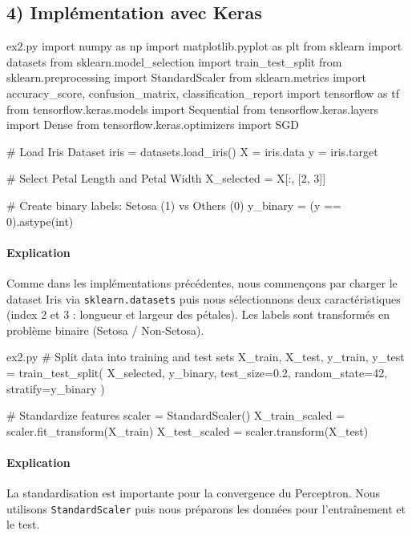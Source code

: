 \documentclass[12pt,a4paper]{article}
\begin{document}

\subsection*{4) Implémentation avec Keras}

\begin{codeholder}{ex2.py}
import numpy as np
import matplotlib.pyplot as plt
from sklearn import datasets
from sklearn.model_selection import train_test_split
from sklearn.preprocessing import StandardScaler
from sklearn.metrics import accuracy_score, confusion_matrix, classification_report
import tensorflow as tf
from tensorflow.keras.models import Sequential
from tensorflow.keras.layers import Dense
from tensorflow.keras.optimizers import SGD

# Load Iris Dataset
iris = datasets.load_iris()
X = iris.data
y = iris.target

# Select Petal Length and Petal Width
X_selected = X[:, [2, 3]]

# Create binary labels: Setosa (1) vs Others (0)
y_binary = (y == 0).astype(int)
\end{codeholder}

\paragraph{Explication}
Comme dans les implémentations précédentes, nous commençons par charger le dataset Iris via \texttt{sklearn.datasets} puis nous sélectionnons deux caractéristiques (index 2 et 3 : longueur et largeur des pétales).
Les labels sont transformés en problème binaire (Setosa / Non-Setosa).


\begin{codeholder}{ex2.py}
# Split data into training and test sets
X_train, X_test, y_train, y_test = train_test_split(
    X_selected, y_binary, test_size=0.2, random_state=42, stratify=y_binary
)

# Standardize features
scaler = StandardScaler()
X_train_scaled = scaler.fit_transform(X_train)
X_test_scaled = scaler.transform(X_test)
\end{codeholder}

\paragraph{Explication}
La standardisation est importante pour la convergence du Perceptron.
Nous utilisons \texttt{StandardScaler} puis nous préparons les données pour l'entraînement et le test.
\end{document}
